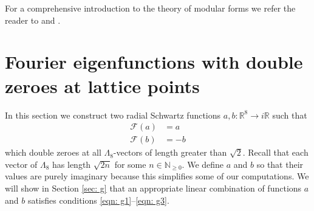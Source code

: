 \documentclass{scrartcl}
\newcommand{\R}{\mathbb{R}}
\newcommand{\N}{\mathbb{N}}
\begin{document}
 For a  comprehensive introduction to the theory of modular forms we refer the  reader to \cite{1-2-3} and \cite{first course}.


\section{Fourier eigenfunctions with double zeroes at lattice points}\label{sec: fourier double zeroes}
In this section we construct two radial Schwartz functions $a,b:\R^8\to i\R$ such that
\begin{align}\mathcal{F}(a)&=a\label{eqn: a fourier}\\
 \mathcal{F}(b)&=-b\label{eqn: b fourier}
\end{align}
which double zeroes at all $\Lambda_8$-vectors of length greater than $\sqrt{2}$. Recall that each vector of $\Lambda_8$ has length $\sqrt{2n}$ for some $n\in\N_{\geq 0}$. We define $a$ and $b$ so that their values are purely imaginary because this simplifies some of our computations. We will show in Section \ref{sec: g} that an appropriate linear combination of functions $a$ and $b$ satisfies conditions \eqref{eqn: g1}--\eqref{eqn: g3}.
\end{document}

